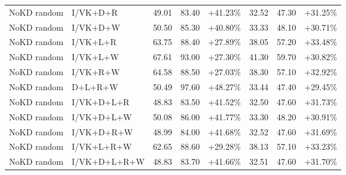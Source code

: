 \documentclass[UTF8,10pt]{ctexart}
\newcommand{\better}[1]{\textcolor{goodblue}{#1}}
\begin{document}
{\begin{longtable}{llrrrrrr}
NoKD random & I/VK+D+R & 49.01 & 83.40 & \better{+41.23\%} & 32.52 & 47.30 & \better{+31.25\%}\\
NoKD random & I/VK+D+W & 50.50 & 85.30 & \better{+40.80\%} & 33.33 & 48.10 & \better{+30.71\%}\\
NoKD random & I/VK+L+R & 63.75 & 88.40 & \better{+27.89\%} & 38.05 & 57.20 & \better{+33.48\%}\\
NoKD random & I/VK+L+W & 67.61 & 93.00 & \better{+27.30\%} & 41.30 & 59.70 & \better{+30.82\%}\\
NoKD random & I/VK+R+W & 64.58 & 88.50 & \better{+27.03\%} & 38.30 & 57.10 & \better{+32.92\%}\\
NoKD random & D+L+R+W & 50.49 & 97.60 & \better{+48.27\%} & 33.44 & 47.40 & \better{+29.45\%}\\
NoKD random & I/VK+D+L+R & 48.83 & 83.50 & \better{+41.52\%} & 32.50 & 47.60 & \better{+31.73\%}\\
NoKD random & I/VK+D+L+W & 50.08 & 86.00 & \better{+41.77\%} & 33.30 & 48.20 & \better{+30.91\%}\\
NoKD random & I/VK+D+R+W & 48.99 & 84.00 & \better{+41.68\%} & 32.52 & 47.60 & \better{+31.69\%}\\
NoKD random & I/VK+L+R+W & 62.65 & 88.60 & \better{+29.28\%} & 38.13 & 57.10 & \better{+33.23\%}\\
NoKD random & I/VK+D+L+R+W & 48.83 & 83.70 & \better{+41.66\%} & 32.51 & 47.60 & \better{+31.70\%}\\


\end{longtable}}
\end{document}
